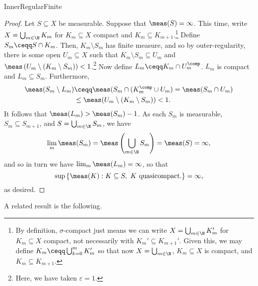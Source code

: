 \begin{prp}{}{InnerRegularFinite}
\begin{proof}
Let $S\subseteq X$ be measurable.  Suppose that $\meas (S)=\infty$.  This time, write $X=\bigcup _{m\in \N}K_m$ for $K_m\subseteq X$ compact and $K_m\subseteq K_{m+1}$.\footnote{By definition, $\sigma$-compact just means we can write $X=\bigcup _{m\in \N}K_m'$ for $K_m\subseteq X$ compact, not necessarily with $K_m'\subseteq K_{m+1}'$.  Given this, we may define $K_m\ceqq \bigcup _{k=0}^mK_m'$ so that now $X=\bigcup _{m\in \N}$, $K_m\subseteq X$ is compact, and $K_m\subseteq K_{m+1}$.}  Define $S_m\ceqq S\cap K_m$.  Then, $K_m\setminus S_m$ has finite measure, and so by outer-regularity, there is some open $U_m\subseteq X$ such that $K_m\setminus S_m\subseteq U_m$ and $\meas \left( U_m\setminus (K_m\setminus S_m)\right) <1$.\footnote{Here, we have taken $\varepsilon =1$.}  Now define $L_m\ceqq K_m\cap U_m^{\comp}$.  $L_m$ is compact and $L_m\subseteq S_m$.  Furthermore,
\begin{equation}
\begin{split}
\meas (S_m\setminus L_m) & \ceqq \meas (S_m\cap (K_m^{\comp}\cup U_m)=\meas (S_m\cap U_m) \\
& \leq \meas (U_m\setminus (K_m\setminus S_m))<1.
\end{split}
\end{equation}
It follows that $\meas (L_m)>\meas (S_m)-1$.   As each $S_m$ is measurable, $S_m\subseteq S_{m+1}$, and $S=\bigcup _{m\in \N}S_m$, we have
\begin{equation}
\lim _m\meas (S_m)=\meas \left( \bigcup _{m\in \N}S_m\right) =\meas (S)=\infty ,
\end{equation}
and so in turn we have $\lim _m\meas (L_m)=\infty$, so that
\begin{equation}
\sup \left\{ \meas (K):K\subseteq S,\ K\text{ quasicompact.}\right\} =\infty ,
\end{equation}
as desired.
\end{proof}
\end{prp}
A related result is the following.
